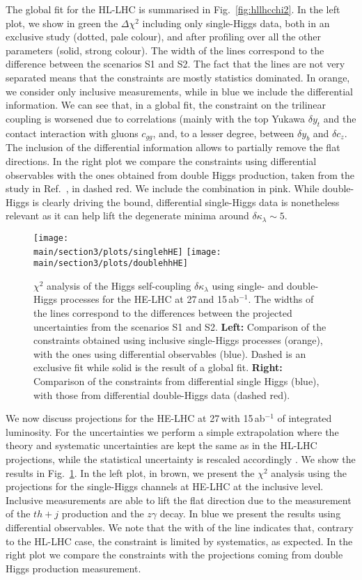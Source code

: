 The global fit for the HL-LHC is summarised in Fig.~\ref{fig:hllhcchi2}. In the left plot, we show in green the $\Delta\chi^2$ including only single-Higgs data, both in an exclusive study (dotted, pale colour), and after profiling over all the other parameters (solid, strong colour). The width of the lines correspond to the difference between the scenarios S1 and S2. The fact that the lines are not very separated means that the constraints are mostly statistics dominated. In orange, we consider only inclusive measurements, while in blue we include the differential information. We can see that, in a global fit, the constraint on the trilinear coupling is worsened due to correlations (mainly with the top Yukawa $\delta y_t$ and the contact interaction with gluons $c_{gg}$, and, to a lesser degree, between $\delta y_b$ and $\delta c_z$. The inclusion of the differential information allows to partially remove the flat directions. In the right plot we compare the constraints using differential observables with the ones obtained from double Higgs production, taken from the study in Ref.~\cite{Azatov:2015oxa}, in dashed red. We include the combination in pink. While double-Higgs is clearly driving the bound, differential single-Higgs data is nonetheless relevant as it can help lift the degenerate minima around $\delta \kappa_\lambda\sim 5$.
\medskip

\begin{figure}
	\centering
	\texttt{[image: \\main/section3/plots/singlehHE]}\hfill
	\texttt{[image: \\main/section3/plots/doublehhHE]}
	\caption{$\chi^2$ analysis of the Higgs self-coupling $\delta \kappa_\lambda$ using single- and double-Higgs processes for the HE-LHC at 27\,\UTeV and 15\,ab$^{-1}$. The widths of the lines correspond to the differences between the projected uncertainties from the scenarios S1 and S2. \textbf{Left:} Comparison of the constraints obtained using inclusive single-Higgs processes (orange), with the ones using differential observables (blue). Dashed is an exclusive fit while solid is the result of a global fit. \textbf{Right:} Comparison of the constraints from differential single Higgs (blue), with those from differential double-Higgs data (dashed red).}
	\label{fig:helhcchi2}
\end{figure}	


We now discuss projections for the HE-LHC at 27\,\UTeV with 15\,ab$^{-1}$ of integrated luminosity. For the uncertainties we perform a simple extrapolation where the theory and systematic uncertainties are kept the same as in the HL-LHC projections, while the statistical uncertainty is rescaled accordingly \cite{Goncalves:2018qas}. We show the results in Fig.~\ref{fig:helhcchi2}. In the left plot, in brown, we present the $\chi^2$ analysis using the projections for the single-Higgs channels at HE-LHC at the inclusive level. Inclusive measurements are able to lift the flat direction due to the measurement of the $th+j$ production and the $z\gamma$ decay. In blue we present the results using differential observables. We note that the with of the line indicates that, contrary to the HL-LHC case, the constraint is limited by systematics, as expected. In the right plot we compare the constraints with the projections coming from double Higgs production measurement.
\medskip
